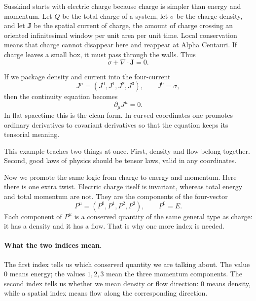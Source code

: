 Susskind starts with electric charge because charge is simpler than energy and momentum. Let \(Q\) be the total charge of a system, let \(\sigma\) be the charge density, and let \(\mathbf J\) be the spatial current of charge, the amount of charge crossing an oriented infinitesimal window per unit area per unit time. Local conservation means that charge cannot disappear here and reappear at Alpha Centauri. If charge leaves a small box, it must pass through the walls. Thus
\begin{equation}
\dot{\sigma}+\nabla\cdot\mathbf J=0.
\end{equation}

If we package density and current into the four-current
\begin{equation}
J^\mu=(J^0,J^1,J^2,J^3), \qquad J^0=\sigma,
\end{equation}
then the continuity equation becomes
\begin{equation}
\partial_\mu J^\mu=0.
\end{equation}
In flat spacetime this is the clean form. In curved coordinates one promotes ordinary derivatives to covariant derivatives so that the equation keeps its tensorial meaning.

This example teaches two things at once. First, density and flow belong together. Second, good laws of physics should be tensor laws, valid in any coordinates.

Now we promote the same logic from charge to energy and momentum. Here there is one extra twist. Electric charge itself is invariant, whereas total energy and total momentum are not. They are the components of the four-vector
\begin{equation}
P^\mu=(P^0,P^1,P^2,P^3), \qquad P^0=E.
\end{equation}
Each component of \(P^\mu\) is a conserved quantity of the same general type as charge: it has a density and it has a flow. That is why one more index is needed.

\paragraph{What the two indices mean.} The first index tells us which conserved quantity we are talking about. The value \(0\) means energy; the values \(1,2,3\) mean the three momentum components. The second index tells us whether we mean density or flow direction: \(0\) means density, while a spatial index means flow along the corresponding direction.

